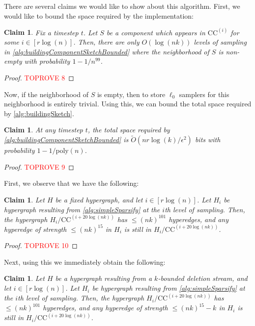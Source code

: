 \documentclass[11pt]{article}
\newtheorem{claim}[theorem]{Claim}
\theoremstyle{definition}
\newcommand{\eps}{\epsilon}
\begin{document}
There are several claims we would like to show about this algorithm. First, we would like to bound the space required by the implementation:

\begin{claim}\label{clm:numberLevelsBounded}
	Fix a timestep $t$. Let $S$ be a component which appears in $\mathrm{CC}^{(i)}$ for some $i \in [r \log(n)]$. Then, there are only $O(\log(nk))$ levels of sampling in \cref{alg:buildingComponentSketchBounded} where the neighborhood of $S$ is non-empty with probability $1 - 1 / n^{99}$.
\end{claim}

\begin{proof}\textcolor{red}{TOPROVE 8}\end{proof}

Now, if the neighborhood of $S$ is empty, then to store $\ell_0$ samplers for this neighborhood is entirely trivial. Using this, we can bound the total space required by \cref{alg:buildingSketch}.

\begin{claim}\label{clm:sketchComponentsSpaceBounded}
	At any timestep $t$, the total space required by \cref{alg:buildingComponentSketchBounded} is $\widetilde{O}(nr \log(k) / \eps^2)$ bits with probability $1 - 1 / \mathrm{poly}(n)$.
\end{claim}

\begin{proof}\textcolor{red}{TOPROVE 9}\end{proof}

First, we observe that we have the following:

\begin{claim}
		Let $H$ be a fixed hypergraph, and let $i \in [r \log(n)]$. Let $H_i$ be hypergraph resulting from \cref{alg:simpleSparsify} at the $i$th level of sampling. Then, the hypergraph $H_i /  \mathrm{CC}^{(i + 20 \log(nk))}$ has $\leq (nk)^{101}$ hyperedges, and any hyperedge of strength $\leq (nk)^{15}$ in $H_i$ is still in $H_i /  \mathrm{CC}^{(i + 20 \log(nk))}$.
\end{claim}

\begin{proof}\textcolor{red}{TOPROVE 10}\end{proof}

Next, using this we immediately obtain the following:

\begin{claim}\label{clm:respectLowStrength}
	Let $H$ be a hypergraph resulting from a $k$-bounded deletion stream, and let $i \in [r \log(n)]$. Let $H_i$ be hypergraph resulting from \cref{alg:simpleSparsify} at the $i$th level of sampling. Then, the hypergraph $H_i /  \mathrm{CC}^{(i + 20 \log(nk))}$ has $\leq (nk)^{101}$ hyperedges, and any hyperedge of strength $\leq (nk)^{15} - k$ in $H_i$ is still in $H_i /  \mathrm{CC}^{(i + 20 \log(nk))}$.
\end{claim}
\end{document}
